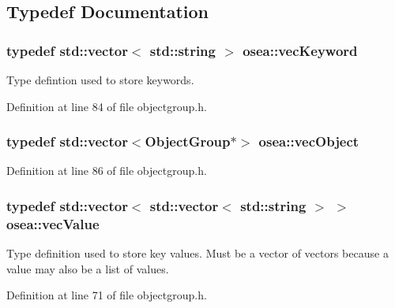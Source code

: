 \subsection{Typedef Documentation}
\hypertarget{namespaceosea_af47d453cb217c2c461685cd6e754c070}{
\subsubsection[{vec\-Keyword}]{\setlength{\rightskip}{0pt plus 5cm}typedef std\-::vector$<$ std\-::string $>$ {\bf osea\-::vec\-Keyword}}}\label{namespaceosea_af47d453cb217c2c461685cd6e754c070}


Type defintion used to store keywords. 



Definition at line 84 of file objectgroup.\-h.

\hypertarget{namespaceosea_ab25fb67447fccb23f5683988d96d2dc2}{
\subsubsection[{vec\-Object}]{\setlength{\rightskip}{0pt plus 5cm}typedef std\-::vector$<${\bf Object\-Group}$\ast$$>$ {\bf osea\-::vec\-Object}}}\label{namespaceosea_ab25fb67447fccb23f5683988d96d2dc2}


Definition at line 86 of file objectgroup.\-h.

\hypertarget{namespaceosea_ae7c5f2bab0fab3931b2ef51a0ad04cc2}{
\subsubsection[{vec\-Value}]{\setlength{\rightskip}{0pt plus 5cm}typedef std\-::vector$<$ std\-::vector$<$ std\-::string $>$ $>$ {\bf osea\-::vec\-Value}}}\label{namespaceosea_ae7c5f2bab0fab3931b2ef51a0ad04cc2}


Type definition used to store key values. Must be a vector of vectors because a value may also be a list of values. 



Definition at line 71 of file objectgroup.\-h.

